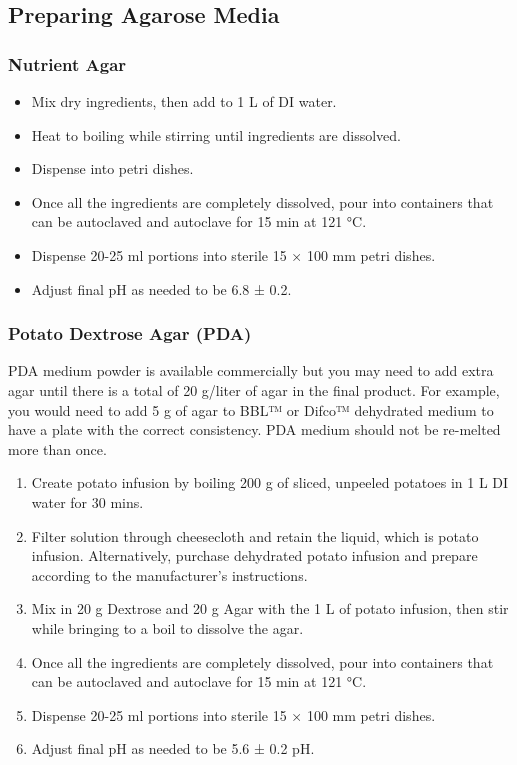 \documentclass{sop_class}[overrideChapters] %
\providecommand{\tightlist}{%
  \setlength{\itemsep}{0pt}\setlength{\parskip}{0pt}}
\begin{document}
{{\subsection{Preparing Agarose Media}\label{prep-media}}

\hypertarget{nutri-agar}{%
\subsubsection{Nutrient Agar}\label{nutri-agar}}
\begin{itemize}
\item
  Mix dry ingredients, then add to 1 L of DI water.
\item
  Heat to boiling while stirring until ingredients are dissolved.
\item
  Dispense into petri dishes.
\item
  Once all the ingredients are completely dissolved, pour into
  containers that can be autoclaved and autoclave for 15 min at 121
  °C.
\item
  Dispense 20-25 ml portions into sterile 15 × 100 mm petri dishes.
\item
  Adjust final pH as needed to be 6.8 ± 0.2.
\end{itemize}
\hypertarget{make-up-pda}{%
\subsubsection{Potato Dextrose Agar (PDA)}\label{make-up-pda}}

PDA medium powder is available commercially but you may need to add
extra agar until there is a total of 20 g/liter of agar in the final
product. For example, you would need to add 5 g of agar to BBL™ or
Difco™ dehydrated medium to have a plate with the correct consistency.
PDA medium should not be re-melted more than once.
\begin{enumerate}
\def\labelenumi{\arabic{enumi}.}
\tightlist
\item
  Create potato infusion by boiling 200 g of sliced, unpeeled potatoes
  in 1 L DI water for 30 mins.
\item
  Filter solution through cheesecloth and retain the liquid, which is
  potato infusion. Alternatively, purchase dehydrated potato infusion
  and prepare according to the manufacturer's instructions.
\item
  Mix in 20 g Dextrose and 20 g Agar with the 1 L of potato infusion,
  then stir while bringing to a boil to dissolve the agar.
\item
  Once all the ingredients are completely dissolved, pour into
  containers that can be autoclaved and autoclave for 15 min at 121
  °C.
\item
  Dispense 20-25 ml portions into sterile 15 × 100 mm petri dishes.
\item
  Adjust final pH as needed to be 5.6 ± 0.2 pH.
\end{enumerate}
\hypertarget{pda-antibio}{%
}}
\end{document}
